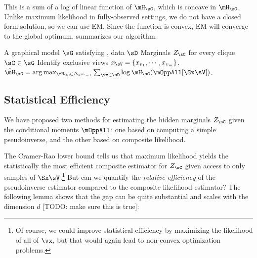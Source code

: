 This is a sum of a log of linear function of $\mH_\sC$, which is concave in
$\mH_\sC$.  Unlike maximum likelihood in fully-observed settings,
we do not have a closed form solution, so we can use EM.
Since the function is convex, EM will converge to the global optimum.
 summarizes our algorithm.

\begin{algorithm}
  \caption{\LearnPiecewise}
  \label{algo:piecewise}
  \begin{algorithmic}
    \REQUIRE A graphical model $\sG$ satisfying , data $\sD$
    \ENSURE Marginals $Z_\sC$ for every clique $\sC \in \sG$
\STATE Identify exclusive views $x_\sV = \{x_{v_1}, \cdots, x_{v_m}\}$.
\STATE $\hat \mH_\sC = \arg\max_{\mH_\sC \in \Delta_{k^m-1}} \sum_{\vx \in \sD} \log \mH_\sC(\mOppAll[\Sx \sV])$.
  \end{algorithmic}
\end{algorithm}

\subsection{Statistical Efficiency}

We have proposed two methods for estimating the hidden marginals $Z_\sC$ given
the conditional moments $\mOppAll$: one based on computing a simple pseudoinverse,
and the other based on composite likelihood.

The Cramer-Rao lower bound tells us that maximum likelihood yields
the statistically the most efficient composite estimator for $Z_\sC$
given access to only samples of $\Sx\sV$.\footnote{Of course, we could improve statistical efficiency
by maximizing the likelihood of all of $\vx$, but that would again lead to non-convex optimization problems.}
But can we quantify the \emph{relative efficiency} of the pseudoinverse estimator
compared to the composite likelihood estimator?
The following lemma shows that the gap can be quite substantial and scales with the dimension $d$ [TODO:
make sure this is true]:

